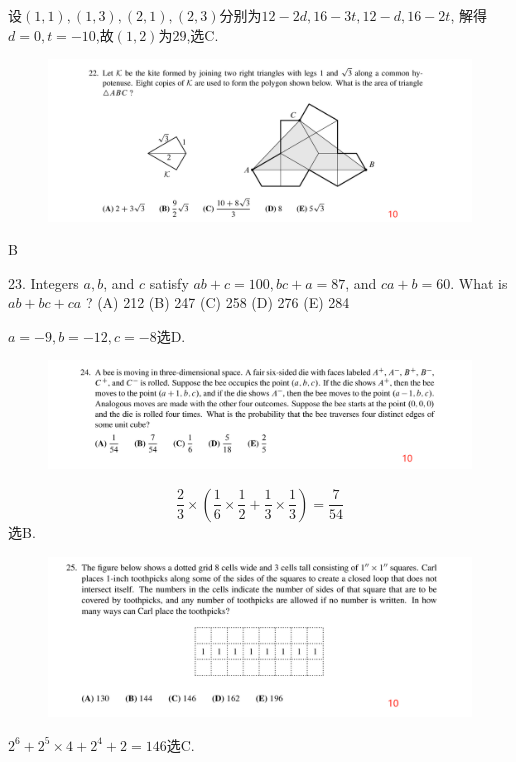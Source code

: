 \documentclass[12pt,a4paper]{article}
\theoremstyle{definition}
\begin{document}
设$(1,1),(1,3),(2,1),(2,3)$分别为$12-2d,16-3t,12-d,16-2t$, 解得$d=0,t=-10$,故$(1,2)$为$29$,选C. 
 
\begin{figure}[H]
    \includegraphics[height=0.3\textheight]{22.png}
\end{figure}

B 

23. Integers $a, b$, and $c$ satisfy $a b+c=100, b c+a=87$, and $c a+b=60$. What is $a b+b c+c a$ ?
(A) 212
(B) 247
(C) 258
(D) 276
(E) 284

$a=-9,b=-12,c=-8$选D.

\begin{figure}[H]
    \includegraphics[height=0.2\textheight]{24.png}
\end{figure}
\begin{equation*}
   \frac{2}{3}\times (\frac{1}{6}\times \frac{1}{2}+ \frac{1}{3}\times \frac{1}{3})=\frac{7}{54}
\end{equation*}
选B. 

\begin{figure}[H]
    \includegraphics[height=0.3\textheight]{25.png}
\end{figure}
$2^6+2^5\times 4+ 2^4+ 2=146$选C. 
\end{document}
